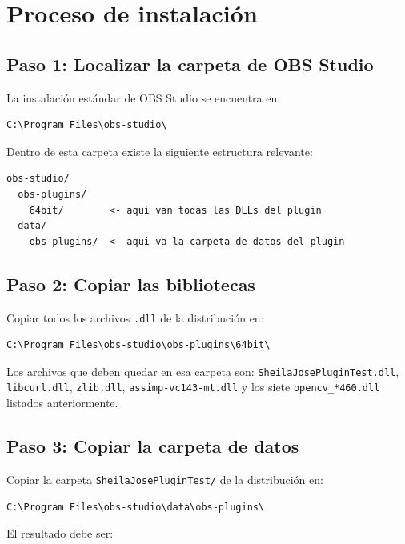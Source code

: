 \section*{Proceso de instalación}

\subsection*{Paso 1: Localizar la carpeta de OBS Studio}

La instalación estándar de OBS Studio se encuentra en:

\begin{verbatim}
C:\Program Files\obs-studio\
\end{verbatim}

Dentro de esta carpeta existe la siguiente estructura relevante:

\begin{verbatim}
obs-studio/
  obs-plugins/
    64bit/        <- aqui van todas las DLLs del plugin
  data/
    obs-plugins/  <- aqui va la carpeta de datos del plugin
\end{verbatim}

\subsection*{Paso 2: Copiar las bibliotecas}

Copiar todos los archivos \texttt{.dll} de la distribución en:

\begin{verbatim}
C:\Program Files\obs-studio\obs-plugins\64bit\
\end{verbatim}

Los archivos que deben quedar en esa carpeta son:
\texttt{SheilaJosePluginTest.dll}, \texttt{libcurl.dll}, \texttt{zlib.dll}, \texttt{assimp-vc143-mt.dll} y los siete \texttt{opencv\_*460.dll} listados anteriormente.

\subsection*{Paso 3: Copiar la carpeta de datos}

Copiar la carpeta \texttt{SheilaJosePluginTest/} de la distribución en:

\begin{verbatim}
C:\Program Files\obs-studio\data\obs-plugins\
\end{verbatim}

El resultado debe ser:

